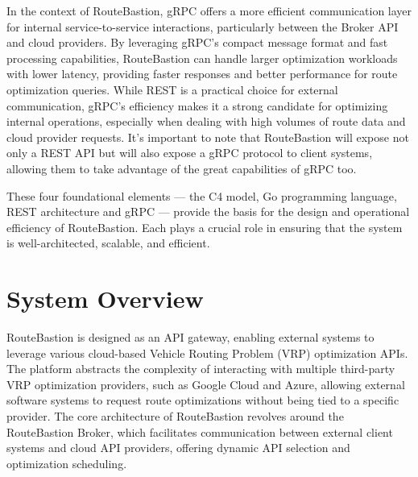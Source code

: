 In the context of RouteBastion, gRPC offers a more efficient communication layer for internal service-to-service interactions, particularly between the Broker API and cloud providers. By leveraging gRPC's compact message format and fast processing capabilities, RouteBastion can handle larger optimization workloads with lower latency, providing faster responses and better performance for route optimization queries. While REST is a practical choice for external communication, gRPC's efficiency makes it a strong candidate for optimizing internal operations, especially when dealing with high volumes of route data and cloud provider requests. It's important to note that RouteBastion will expose not only a REST API but will also expose a gRPC protocol to client systems, allowing them to take advantage of the great capabilities of gRPC too.

These four foundational elements — the C4 model, Go programming language, REST architecture and gRPC — provide the basis for the design and operational efficiency of RouteBastion. Each plays a crucial role in ensuring that the system is well-architected, scalable, and efficient.

\section{System Overview}
\label{sec:system_overview}
RouteBastion is designed as an API gateway, enabling external systems to leverage various cloud-based Vehicle Routing Problem (VRP) optimization APIs. The platform abstracts the complexity of interacting with multiple third-party VRP optimization providers, such as Google Cloud and Azure, allowing external software systems to request route optimizations without being tied to a specific provider. The core architecture of RouteBastion revolves around the RouteBastion Broker, which facilitates communication between external client systems and cloud API providers, offering dynamic API selection and optimization scheduling.
